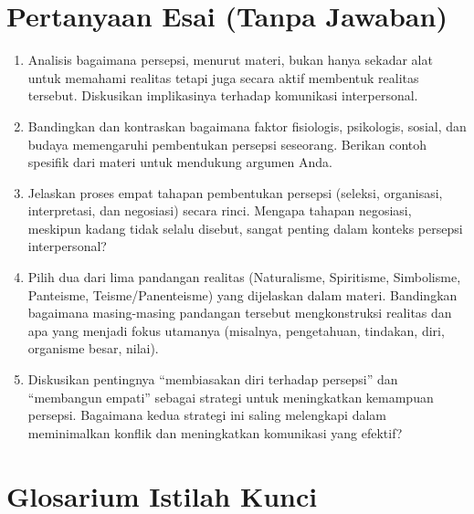 \documentclass[
  letterpaper,
  DIV=11,
  numbers=noendperiod]{scrreprt}
\providecommand{\tightlist}{%
  \setlength{\itemsep}{0pt}\setlength{\parskip}{0pt}}
\begin{document}
\section{Pertanyaan Esai (Tanpa
Jawaban)}\label{pertanyaan-esai-tanpa-jawaban}

\begin{enumerate}
\def\labelenumi{\arabic{enumi}.}
\tightlist
\item
  Analisis bagaimana persepsi, menurut materi, bukan hanya sekadar alat
  untuk memahami realitas tetapi juga secara aktif membentuk realitas
  tersebut. Diskusikan implikasinya terhadap komunikasi interpersonal.
\item
  Bandingkan dan kontraskan bagaimana faktor fisiologis, psikologis,
  sosial, dan budaya memengaruhi pembentukan persepsi seseorang. Berikan
  contoh spesifik dari materi untuk mendukung argumen Anda.
\item
  Jelaskan proses empat tahapan pembentukan persepsi (seleksi,
  organisasi, interpretasi, dan negosiasi) secara rinci. Mengapa tahapan
  negosiasi, meskipun kadang tidak selalu disebut, sangat penting dalam
  konteks persepsi interpersonal?
\item
  Pilih dua dari lima pandangan realitas (Naturalisme, Spiritisme,
  Simbolisme, Panteisme, Teisme/Panenteisme) yang dijelaskan dalam
  materi. Bandingkan bagaimana masing-masing pandangan tersebut
  mengkonstruksi realitas dan apa yang menjadi fokus utamanya (misalnya,
  pengetahuan, tindakan, diri, organisme besar, nilai).
\item
  Diskusikan pentingnya ``membiasakan diri terhadap persepsi'' dan
  ``membangun empati'' sebagai strategi untuk meningkatkan kemampuan
  persepsi. Bagaimana kedua strategi ini saling melengkapi dalam
  meminimalkan konflik dan meningkatkan komunikasi yang efektif?
\end{enumerate}

\section{Glosarium Istilah Kunci}\label{glosarium-istilah-kunci-2}
\end{document}
